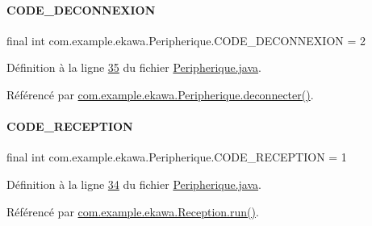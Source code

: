 \paragraph{\texorpdfstring{C\+O\+D\+E\+\_\+\+D\+E\+C\+O\+N\+N\+E\+X\+I\+ON}{CODE\_DECONNEXION}}
{\footnotesize\ttfamily final int com.\+example.\+ekawa.\+Peripherique.\+C\+O\+D\+E\+\_\+\+D\+E\+C\+O\+N\+N\+E\+X\+I\+ON = 2\hspace{0.3cm}{\ttfamily [static]}}



Définition à la ligne \hyperlink{_peripherique_8java_source_l00035}{35} du fichier \hyperlink{_peripherique_8java_source}{Peripherique.\+java}.



Référencé par \hyperlink{_peripherique_8java_source_l00150}{com.\+example.\+ekawa.\+Peripherique.\+deconnecter()}.

\mbox{\label{classcom_1_1example_1_1ekawa_1_1_peripherique_a532f5da1747b68217b8764db9b85e845}} 
\paragraph{\texorpdfstring{C\+O\+D\+E\+\_\+\+R\+E\+C\+E\+P\+T\+I\+ON}{CODE\_RECEPTION}}
{\footnotesize\ttfamily final int com.\+example.\+ekawa.\+Peripherique.\+C\+O\+D\+E\+\_\+\+R\+E\+C\+E\+P\+T\+I\+ON = 1\hspace{0.3cm}{\ttfamily [static]}}



Définition à la ligne \hyperlink{_peripherique_8java_source_l00034}{34} du fichier \hyperlink{_peripherique_8java_source}{Peripherique.\+java}.



Référencé par \hyperlink{_reception_8java_source_l00043}{com.\+example.\+ekawa.\+Reception.\+run()}.

\mbox{\label{classcom_1_1example_1_1ekawa_1_1_peripherique_ab6a0c0cae2eb087315d0d04d1cf6c3dc}} 
